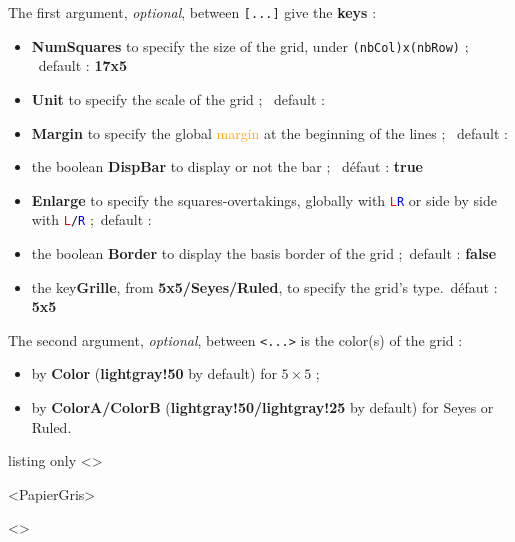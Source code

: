 \documentclass[a4paper]{article}
\newcommand\Cle[1]{{\bfseries\sffamily\textlangle #1\textrangle}}
\begin{document}
The first argument, \textit{optional}, between \texttt{[...]} give the \Cle{keys} :

\begin{itemize}
	\item \Cle{NumSquares} to specify the size of the grid, under \texttt{(nbCol)x(nbRow)} ; \hfill~default : \Cle{17x5}
	\item \Cle{Unit} to specify the scale of the grid ; \hfill~default : \Cle{1}
	\item \Cle{Margin} to specify the global \textcolor{orange}{margin} at the beginning of the lines ; \hfill~default : \Cle{0}
	\item the boolean \Cle{DispBar} to display or not the bar ; \hfill~défaut : \Cle{true}
	\item \Cle{Enlarge} to specify the squares-overtakings, globally with \texttt{\textcolor{red}{L}\textcolor{blue}{R}} or side by side with \texttt{\textcolor{red}{L}/\textcolor{blue}{R}} ;\hfill~default : \Cle{0}
	\item the boolean \Cle{Border} to display the basis border of the grid ;\hfill~default : \Cle{false}
	\item the key\Cle{Grille}, from \Cle{5x5/Seyes/Ruled}, to specify the grid's type.\hfill~défaut : \Cle{5x5}
\end{itemize}

The second argument, \textit{optional}, between \texttt{<...>} is the color(s) of the grid :

\begin{itemize}
	\item by \Cle{Color} (\Cle{lightgray!50} by default) for $5\times5$  ;
	\item by \Cle{ColorA/ColorB} (\Cle{lightgray!50/lightgray!25} by default) for Seyes or Ruled.
\end{itemize}

\medskip

\begin{PresentationCode}{listing only}
\DispGrid[NumSquares=18x4,Grid=Seyes,DispBar=false]<\ColSeyes>

\DispGrid[NumSquares=36x8,Enlarge=3/3]<PapierGris>

\begin{center}
	\DispGrid[NumSquares=12x3,Grid=Ruled,Margin=2]<\ColRuled>
\end{center}
\end{PresentationCode}
\end{document}

